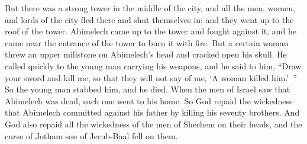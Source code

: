 \begin{biblechapter}
\verse But there was a strong tower in the middle of the city, and all the men, women, and lords of the city fled there and shut themselves in; and they went up to the roof of the tower.
\verse Abimelech came up to the tower and fought against it, and he came near the entrance of the tower to burn it with fire.
\verse But a certain woman threw an upper millstone on Abimelech’s head and cracked open his skull.
\verse He called quickly to the young man carrying his weapons, and he said to him, “Draw your sword and kill me, so that they will not say of me, ‘A woman killed him.’ ” So the young man stabbed him, and he died.
\verse When the men of Israel saw that Abimelech was dead, each one went to his home.
\verse So God repaid the wickedness that Abimelech committed against his father by killing his seventy brothers.
\verse And God also repaid all the wickedness of the men of Shechem on their heads, and the curse of Jotham son of Jerub-Baal fell on them.
\end{biblechapter}

